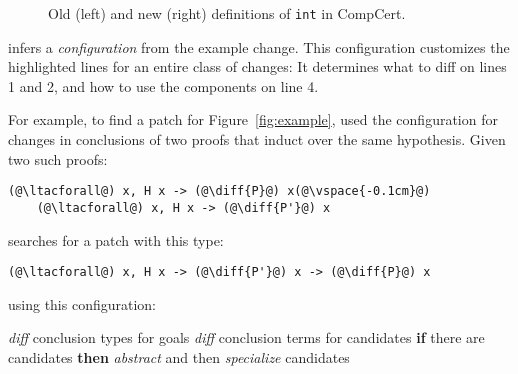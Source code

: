 \begin{figure*}[ht]
\begin{minipage}{0.48\textwidth}
\lstset{language=coq, aboveskip=0pt,belowskip=0pt}


\end{minipage}
\hfill
\begin{minipage}{0.48\textwidth}
\lstset{language=coq, aboveskip=0pt,belowskip=0pt}


\end{minipage}
\vspace{-.3cm}
\caption[Caption for LOF]{Old (left) and new (right) definitions of \lstinline{int} in CompCert.}
\label{fig:int}
\end{figure*}

\sysname infers a \textit{configuration} from the example change.
This configuration customizes the highlighted lines for an entire class of changes:
It determines what to diff on lines 1 and 2,
and how to use the components on line 4.

For example, to find a patch for Figure~\ref{fig:example},
\sysname used the configuration for changes in conclusions of two proofs
that induct over the same hypothesis. Given two such
proofs:

\begin{lstlisting}[language=coq]
    (@\ltacforall@) x, H x -> (@\diff{P}@) x(@\vspace{-0.1cm}@)
    (@\ltacforall@) x, H x -> (@\diff{P'}@) x
\end{lstlisting}
\sysname searches for a patch with this type:

\begin{lstlisting}[language=coq]
    (@\ltacforall@) x, H x -> (@\diff{P'}@) x -> (@\diff{P}@) x
\end{lstlisting}
using this configuration:

\begin{algorithm}
\footnotesize
\begin{algorithmic}[1]
    \STATE \textit{diff} conclusion types for goals
    \STATE \textit{diff} conclusion terms for candidates
    \STATE \textbf{if} there are candidates \textbf{then}
    \STATE \hspace*{1em} \textit{abstract} and then \textit{specialize} candidates
\end{algorithmic}
\end{algorithm}

